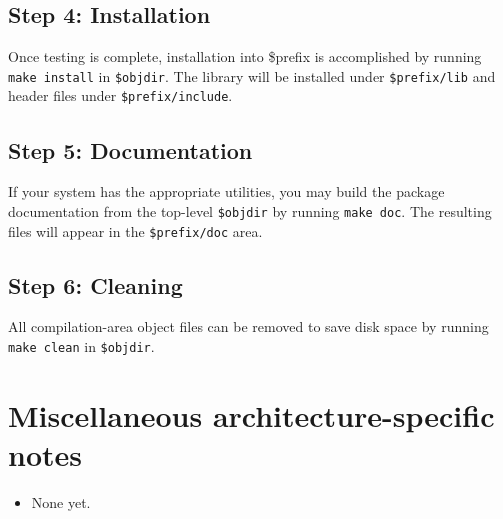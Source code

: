 \documentclass[12pt]{article}
\begin{document}
\subsection{Step 4: Installation}

Once testing is complete, installation into \$prefix is accomplished by
running {\tt make install} in {\tt \$objdir}.  The library will be
installed under {\tt \$prefix/lib} and header files under {\tt \$prefix/include}.

\subsection{Step 5: Documentation}

If your system has the appropriate utilities, you may build the package
documentation from the top-level {\tt \$objdir} by running {\tt make doc}.  
The resulting files will appear in the {\tt \$prefix/doc} area.

\subsection{Step 6: Cleaning}

All compilation-area object files can be removed to save
disk space by running {\tt make clean} in {\tt \$objdir}.

\section{Miscellaneous architecture-specific notes}
\begin{itemize}
\item None yet.
\end{itemize}
\end{document}
